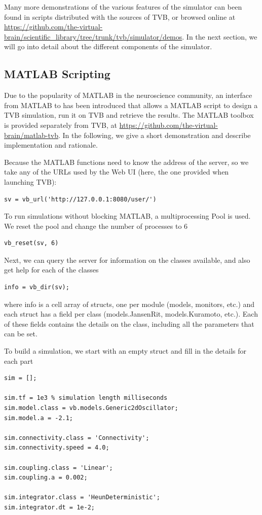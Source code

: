 Many more demonstrations of the various features of the simulator
can been found in scripts distributed with the sources of TVB, or 
browsed online at \url{https://github.com/the-virtual-brain/scientific_library/tree/trunk/tvb/simulator/demos}.
In the next section, we will go into detail about the different
components of the simulator.

\subsection{MATLAB Scripting}

Due to the popularity of MATLAB in the neuroscience community, an
interface from MATLAB to \TVB has been introduced that allows a MATLAB
script to design a TVB simulation, run it on TVB and retrieve the 
results. The MATLAB toolbox is provided separately from TVB, at
\url{https://github.com/the-virtual-brain/matlab-tvb}.
In the following, we give a short demonstration and 
describe implementation and rationale.

Because the MATLAB functions need to know the address of the server,
so we take any of the URLs used by the Web UI (here, the one provided
when launching TVB):

\begin{lstlisting}
sv = vb_url('http://127.0.0.1:8080/user/')
\end{lstlisting}

To run simulations without blocking MATLAB, a multiprocessing Pool
is used. We reset the pool and change the number of processes to 6

\begin{lstlisting}
vb_reset(sv, 6)
\end{lstlisting}

Next, we can query the server for information on the classes available,
and also get help for each of the classes

\begin{lstlisting}
info = vb_dir(sv);
\end{lstlisting}

\noindent where info is a cell array of structs, one per module (models,
monitors, etc.) and each struct has a field per class (models.JansenRit, 
models.Kuramoto, etc.). Each of these fields contains the details on 
the class, including all the parameters that can be set. 

To build a simulation, we start with an empty struct
and fill in the details for each part

\begin{lstlisting}
sim = [];

sim.tf = 1e3 % simulation length milliseconds
sim.model.class = vb.models.Generic2dOscillator;
sim.model.a = -2.1;

sim.connectivity.class = 'Connectivity';
sim.connectivity.speed = 4.0;

sim.coupling.class = 'Linear';
sim.coupling.a = 0.002;

sim.integrator.class = 'HeunDeterministic';
sim.integrator.dt = 1e-2;
\end{lstlisting}

